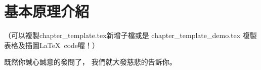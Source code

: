 \documentclass[class=NCU_thesis, crop=false]{standalone}
\begin{document}
\chapter{基本原理介紹}
（可以複製chapter\_template.tex新增子檔或是
chapter\_template\_demo.tex 複製表格及插圖\LaTeX\ code喔！）

既然你誠心誠意的發問了，
我們就大發慈悲的告訴你。
\end{document}
